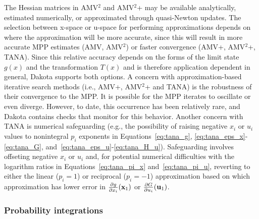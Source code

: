 The Hessian matrices in AMV$^2$ and AMV$^2$+ may be available
analytically, estimated numerically, or approximated through
quasi-Newton updates.  The selection between x-space or u-space for
performing approximations depends on where the approximation will be
more accurate, since this will result in more accurate MPP estimates
(AMV, AMV$^2$) or faster convergence (AMV+, AMV$^2$+, TANA).  Since
this relative accuracy depends on the forms of the limit state $g(x)$
and the transformation $T(x)$ and is therefore application dependent
in general, Dakota supports both options.  A concern with
approximation-based iterative search methods (i.e., AMV+, AMV$^2$+ and
TANA) is the robustness of their convergence to the MPP.  It is
possible for the MPP iterates to oscillate or even diverge.  However,
to date, this occurrence has been relatively rare, and Dakota contains
checks that monitor for this behavior.  Another concern with TANA is
numerical safeguarding (e.g., the possibility of raising negative
$x_i$ or $u_i$ values to nonintegral $p_i$ exponents in
Equations~\ref{eq:tana_g}, \ref{eq:tana_eps_x}-\ref{eq:tana_G},
and~\ref{eq:tana_eps_u}-\ref{eq:tana_H_u}).  Safeguarding involves
offseting negative $x_i$ or $u_i$ and, for potential numerical
difficulties with the logarithm ratios in Equations~\ref{eq:tana_pi_x}
and~\ref{eq:tana_pi_u}, reverting to either the linear ($p_i = 1$) or
reciprocal ($p_i = -1$) approximation based on which approximation has
lower error in $\frac{\partial g}{\partial x_i}({\bf x}_1)$ or
$\frac{\partial G}{\partial u_i}({\bf u}_1)$.

\subsubsection{Probability integrations} \label{uq:reliability:local:mpp:int}

